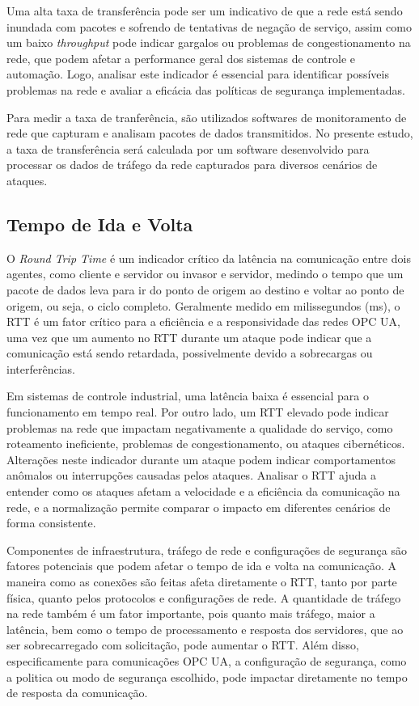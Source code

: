     Uma alta taxa de transferência pode ser um indicativo de que a rede está sendo inundada com pacotes e sofrendo de tentativas de negação de serviço, assim como um baixo \textit{throughput} pode indicar gargalos ou problemas de congestionamento na rede, que podem afetar a performance geral dos sistemas de controle e automação. Logo, analisar este indicador é essencial para identificar possíveis problemas na rede e avaliar a eficácia das políticas de segurança implementadas.

    Para medir a taxa de tranferência, são utilizados softwares de monitoramento de rede que capturam e analisam pacotes de dados transmitidos. No presente estudo, a taxa de transferência será calculada por um software desenvolvido para processar os dados de tráfego da rede capturados para diversos cenários de ataques.

    \subsection{Tempo de Ida e Volta}

    O \textit{Round Trip Time} é um indicador crítico da latência na comunicação entre dois agentes, como cliente e servidor ou invasor e servidor, medindo o tempo que um pacote de dados leva para ir do ponto de origem ao destino e voltar ao ponto de origem, ou seja, o ciclo completo. Geralmente medido em milissegundos (ms), o RTT é um fator crítico para a eficiência e a responsividade das redes OPC UA, uma vez que um aumento no RTT durante um ataque pode indicar que a comunicação está sendo retardada, possivelmente devido a sobrecargas ou interferências.

    Em sistemas de controle industrial, uma latência baixa é essencial para o funcionamento em tempo real. Por outro lado, um RTT elevado pode indicar problemas na rede que impactam negativamente a qualidade do serviço, como roteamento ineficiente, problemas de congestionamento, ou ataques cibernéticos. Alterações neste indicador durante um ataque podem indicar comportamentos anômalos ou interrupções causadas pelos ataques. Analisar o RTT ajuda a entender como os ataques afetam a velocidade e a eficiência da comunicação na rede, e a normalização permite comparar o impacto em diferentes cenários de forma consistente.

    Componentes de infraestrutura, tráfego de rede e configurações de segurança são fatores potenciais que podem afetar o tempo de ida e volta na comunicação. A maneira como as conexões são feitas afeta diretamente o RTT, tanto por parte física, quanto pelos protocolos e configurações de rede. A quantidade de tráfego na rede também é um fator importante, pois quanto mais tráfego, maior a latência, bem como o tempo de processamento e resposta dos servidores, que ao ser sobrecarregado com solicitação, pode aumentar o RTT. Além disso, especificamente para comunicações OPC UA, a configuração de segurança, como a politica ou modo de segurança escolhido, pode impactar diretamente no tempo de resposta da comunicação.

